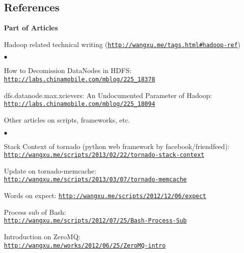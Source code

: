 \documentclass[a4paper,margin,line]{res}
\newenvironment{list1}{
  \begin{list}{\ding{113}}{%
      \setlength{\itemsep}{0in}
      \setlength{\parsep}{0in} \setlength{\parskip}{0in}
      \setlength{\topsep}{0in} \setlength{\partopsep}{0in} 
      \setlength{\leftmargin}{0.17in}}}{\end{list}}
\newenvironment{list2}{
  \begin{list}{$\bullet$}{%
      \setlength{\itemsep}{0in}
      \setlength{\parsep}{0in} \setlength{\parskip}{0in}
      \setlength{\topsep}{0in} \setlength{\partopsep}{0in} 
      \setlength{\leftmargin}{0.2in}}}{\end{list}}
\newcommand{\http}{http:/\hspace{-0.3ex}/}
\newcommand{\hindent}{\mbox{\hspace{8ex}}}
\begin{document}
\begin{resume}
\section{\sc References}
\textbf{Part of Articles}\\
\vspace*{-.1in}
\begin{list1}
\item[] Hadoop related technical writing (\href{http://wangxu.me/tags.html\#hadoop-ref}{\tt\http{}wangxu.me/tags.html\#hadoop-ref})
\begin{list2}
\vspace*{.05in}
\item How to Decomission DataNodes in HDFS: \\
	\hindent\href{http://labs.chinamobile.com/mblog/225_18378}{\tt\http{}labs.chinamobile.com/mblog/225\_18378}
\item dfs.datanode.max.xcievers: An Undocumented Parameter of Hadoop: \\
	\hindent\href{http://labs.chinamobile.com/mblog/225_18094}{\tt\http{}labs.chinamobile.com/mblog/225\_18094}
\vspace*{.05in}
\end{list2}
\item[] Other articles on scripts, frameworks, etc.
\begin{list2}
\vspace*{.05in}
\item Stack Context of tornado (python web framework by facebook/friendfeed):\\
  \hindent\href{http://wangxu.me/scripts/2013/02/22/tornado-stack-context}{\tt\http{}wangxu.me/scripts/2013/02/22/tornado-stack-context}
\item Update on tornado-memcache:\\
  \hindent\href{http://wangxu.me/scripts/2013/03/07/tornado-memcache}{\tt\http{}wangxu.me/scripts/2013/03/07/tornado-memcache}
\item Words on expect: \href{http://wangxu.me/scripts/2012/12/06/expect}{\tt\http{}wangxu.me/scripts/2012/12/06/expect}
\item Process sub of Bash:\\
  \hindent\href{http://wangxu.me/scripts/2012/07/25/Bash-Process-Sub}{\tt\http{}wangxu.me/scripts/2012/07/25/Bash-Process-Sub}
\item Introduction on ZeroMQ:\\
\hindent\href{http://wangxu.me/works/2012/06/25/ZeroMQ-intro}{\tt\http{}wangxu.me/works/2012/06/25/ZeroMQ-intro}
\vspace*{.05in}
\end{list2}
\end{list1}


\end{resume}
\end{document}
